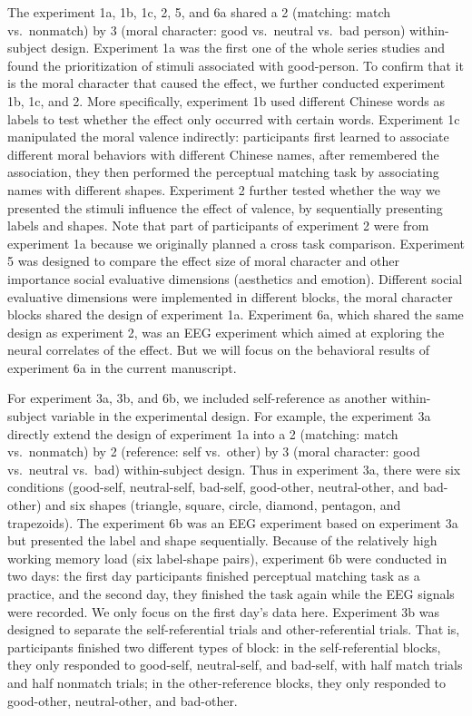 \documentclass[
  man]{apa6}
\begin{document}
The experiment 1a, 1b, 1c, 2, 5, and 6a shared a 2 (matching: match vs.~nonmatch) by 3 (moral character: good vs.~neutral vs.~bad person) within-subject design. Experiment 1a was the first one of the whole series studies and found the prioritization of stimuli associated with good-person. To confirm that it is the moral character that caused the effect, we further conducted experiment 1b, 1c, and 2. More specifically, experiment 1b used different Chinese words as labels to test whether the effect only occurred with certain words. Experiment 1c manipulated the moral valence indirectly: participants first learned to associate different moral behaviors with different Chinese names, after remembered the association, they then performed the perceptual matching task by associating names with different shapes. Experiment 2 further tested whether the way we presented the stimuli influence the effect of valence, by sequentially presenting labels and shapes. Note that part of participants of experiment 2 were from experiment 1a because we originally planned a cross task comparison. Experiment 5 was designed to compare the effect size of moral character and other importance social evaluative dimensions (aesthetics and emotion). Different social evaluative dimensions were implemented in different blocks, the moral character blocks shared the design of experiment 1a. Experiment 6a, which shared the same design as experiment 2, was an EEG experiment which aimed at exploring the neural correlates of the effect. But we will focus on the behavioral results of experiment 6a in the current manuscript.

For experiment 3a, 3b, and 6b, we included self-reference as another within-subject variable in the experimental design. For example, the experiment 3a directly extend the design of experiment 1a into a 2 (matching: match vs.~nonmatch) by 2 (reference: self vs.~other) by 3 (moral character: good vs.~neutral vs.~bad) within-subject design. Thus in experiment 3a, there were six conditions (good-self, neutral-self, bad-self, good-other, neutral-other, and bad-other) and six shapes (triangle, square, circle, diamond, pentagon, and trapezoids). The experiment 6b was an EEG experiment based on experiment 3a but presented the label and shape sequentially. Because of the relatively high working memory load (six label-shape pairs), experiment 6b were conducted in two days: the first day participants finished perceptual matching task as a practice, and the second day, they finished the task again while the EEG signals were recorded. We only focus on the first day's data here. Experiment 3b was designed to separate the self-referential trials and other-referential trials. That is, participants finished two different types of block: in the self-referential blocks, they only responded to good-self, neutral-self, and bad-self, with half match trials and half nonmatch trials; in the other-reference blocks, they only responded to good-other, neutral-other, and bad-other.
\end{document}
